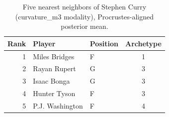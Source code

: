 \begin{table}[htbp]
  \centering\small
  \begin{tabular}{rllc}
    \toprule
    Rank & Player & Position & Archetype \\
    \midrule
    1 & Miles Bridges & F & 1 \\
    2 & Rayan Rupert & G & 3 \\
    3 & Isaac Bonga & G & 3 \\
    4 & Hunter Tyson & F & 3 \\
    5 & P.J. Washington & F & 4 \\
    \bottomrule
  \end{tabular}
  \caption{Five nearest neighbors of Stephen Curry (curvature_m3 modality), Procrustes-aligned posterior mean.}
  \label{tab:Stephen_Curry_neighbors_curvature_m3}
\end{table}

